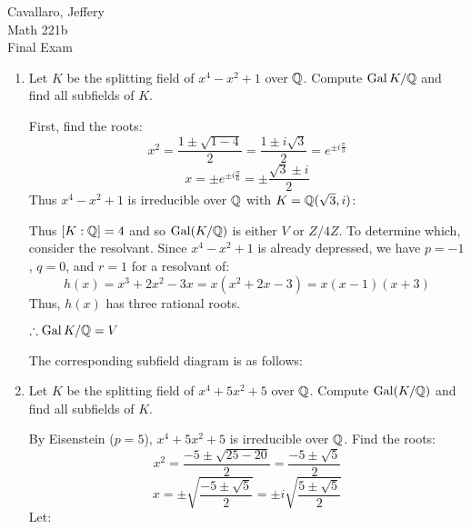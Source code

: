 \documentclass[letterpaper,12pt,fleqn]{article}
\DeclareMathOperator{\Gal}{Gal}
\begin{document}
Cavallaro, Jeffery \\
Math 221b \\
Final Exam

\bigskip

\begin{enumerate}
\item Let $K$ be the splitting field of $x^4-x^2+1$ over $\mathbb{Q}$. Compute
  $\Gal{K/\Q}$ and find all subfields of $K$.

  First, find the roots:
  \[x^2=\frac{1\pm\sqrt{1-4}}{2}=\frac{1\pm i\sqrt{3}}{2}=
  e^{\pm i\frac{\pi}{3}}\]
  \[x=\pm e^{\pm i\frac{\pi}{6}}=\pm\frac{\sqrt{3}\pm i}{2}\]
  Thus $x^4-x^2+1$ is irreducible over $\mathbb{Q}$ with $K=\mathbb{Q}(\sqrt{3},i)$:


  Thus $[K:\mathbb{Q}]=4$ and so $\Gal(K/\Q)$ is either $V$ or $Z/4Z$. To determine
  which, consider the resolvant. Since $x^4-x^2+1$ is already depressed, we
  have $p=-1$, $q=0$, and $r=1$ for a resolvant of:
  \[h(x)=x^3+2x^2-3x=x(x^2+2x-3)=x(x-1)(x+3)\]
  Thus, $h(x)$ has three rational roots.

  $\therefore \Gal{K/\Q}=V$

  The corresponding subfield diagram is as follows:


\item Let $K$ be the splitting field of $x^4+5x^2+5$ over $\mathbb{Q}$. Compute
  $\Gal(K/\Q)$ and find all subfields of $K$.

  By Eisenstein ($p=5$), $x^4+5x^2+5$ is irreducible over $\mathbb{Q}$. Find the roots:
  \[x^2=\frac{-5\pm\sqrt{25-20}}{2}=\frac{-5\pm\sqrt{5}}{2}\]
  \[x=\pm\sqrt{\frac{-5\pm\sqrt{5}}{2}}=\pm i\sqrt{\frac{5\pm\sqrt{5}}{2}}\]
  Let:
  

\end{enumerate}
\end{document}
